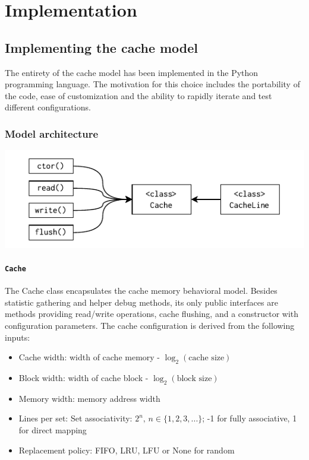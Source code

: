 
\chapter{Implementation}

\section{Implementing the cache model}

The entirety of the cache model has been implemented in the Python programming language. The motivation for this choice includes the portability of the code, ease of customization and
the ability to rapidly iterate and test different configurations.

\subsection{Model architecture}

\begin{center}
	\centering
	\includegraphics[width=\textwidth]{figures/04-implementation/cache_mdl_arch.pdf}
	\label{fig:cache_mdl_arch}
\end{center}

\subsubsection{\texttt{Cache}} \label{sec:cache_model}

The Cache class encapsulates the cache memory behavioral model. Besides statistic gathering and helper debug methods, its only public interfaces are methods
providing read/write operations, cache flushing, and a constructor with configuration parameters. The cache configuration is derived from the following inputs:
\begin{itemize}
	\item Cache width: width of cache memory - $\log_2(\text{cache size})$
	\item Block width: width of cache block - $\log_2(\text{block size})$
	\item Memory width: memory address width
	\item Lines per set: Set associativity: $2^n,\, n \in \{1, 2, 3, ...\}$; -1 for fully associative, 1 for direct mapping
	\item Replacement policy: FIFO, LRU, LFU or None for random
\end{itemize}


